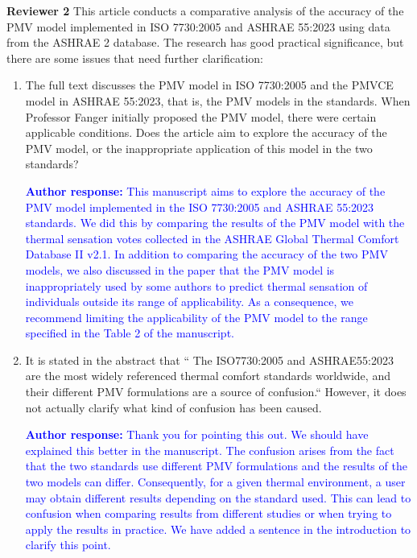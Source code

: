 \documentclass[a4paper, 10pt]{letter}
\newcommand{\response}[1]{\textcolor{blue}{\textbf{Author response:} #1}}
\begin{document}
\begin{letter}
\begin{enumerate}
        \end{enumerate}

        \clearpage

        \textbf{Reviewer 2}
        This article conducts a comparative analysis of the accuracy of the PMV model implemented in ISO 7730:2005 and ASHRAE 55:2023 using data from the ASHRAE 2 database.
        The research has good practical significance, but there are some issues that need further clarification:

        \begin{enumerate}
            \item The full text discusses the PMV model in ISO 7730:2005 and the PMVCE model in ASHRAE 55:2023, that is, the PMV models in the standards.
            When Professor Fanger initially proposed the PMV model, there were certain applicable conditions.
            Does the article aim to explore the accuracy of the PMV model, or the inappropriate application of this model in the two standards?

            \response{This manuscript aims to explore the accuracy of the PMV model implemented in the ISO 7730:2005 and ASHRAE 55:2023 standards.
            We did this by comparing the results of the PMV model with the thermal sensation votes collected in the ASHRAE Global Thermal Comfort Database II v2.1.
            In addition to comparing the accuracy of the two PMV models, we also discussed in the paper that the PMV model is inappropriately used by some authors to predict thermal sensation of individuals outside its range of applicability.
            As a consequence, we recommend limiting the applicability of the PMV model to the range specified in the Table 2 of the manuscript.
            }

            \item It is stated in the abstract that `` The ISO7730:2005 and ASHRAE55:2023 are the most widely referenced thermal comfort standards worldwide, and their different PMV formulations are a source of confusion.``
            However, it does not actually clarify what kind of confusion has been caused.

            \response{Thank you for pointing this out.
            We should have explained this better in the manuscript.
            The confusion arises from the fact that the two standards use different PMV formulations and the results of the two models can differ.
            Consequently, for a given thermal environment, a user may obtain different results depending on the standard used.
            This can lead to confusion when comparing results from different studies or when trying to apply the results in practice.
            We have added a sentence in the introduction to clarify this point.
            }


\end{enumerate}
\end{letter}
\end{document}
